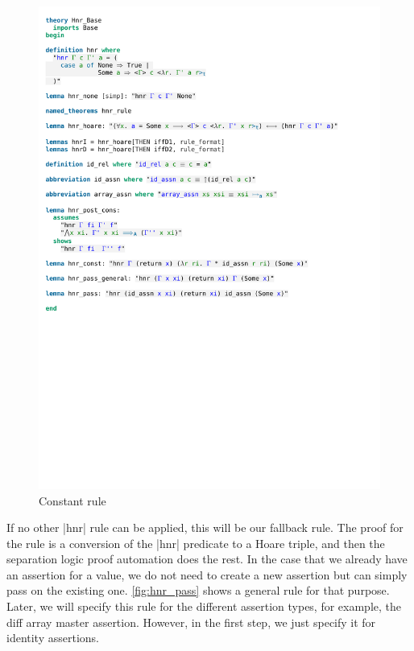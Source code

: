 \begin{figure}[htpb]
    \includegraphics[trim={0 13,6cm 0 15,4cm}, clip, width=1.00\textwidth]{figures/Theory_Hnr_Base.pdf}
    \caption[Constant rule]{Constant rule}
    \label{fig:hnr_const}
\end{figure}

\noindent If no other |hnr| rule can be applied, this will be our fallback rule. The proof for the rule is a conversion of the |hnr| predicate to a Hoare triple, and then the separation logic proof automation does the rest.
In the case that we already have an assertion for a value, we do not need to create a new assertion but can simply pass on the existing one. \autoref{fig:hnr_pass} shows a general rule for that purpose. Later, we will specify this rule for the different assertion types, for example, the diff array master assertion. However, in the first step, we just specify it for identity assertions.


